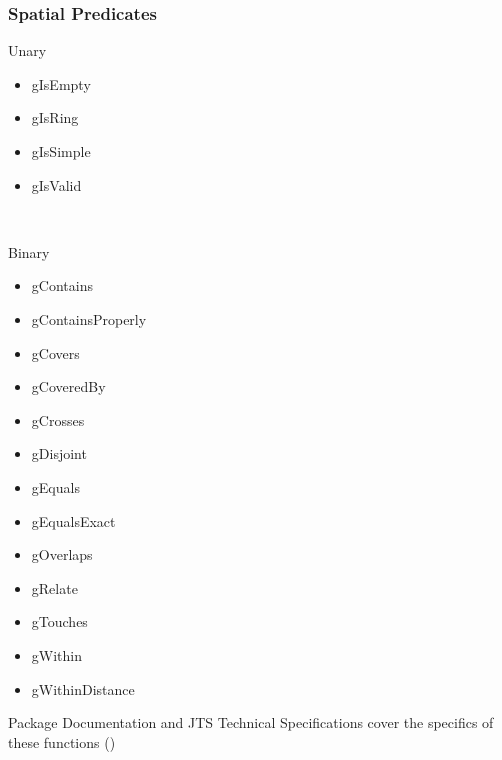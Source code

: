 \documentclass[slidestop,mathserif]{beamer}
\begin{document}
\begin{frame}
\frametitle{Spatial Predicates}

\begin{beamerboxesrounded}{Unary}
\begin{multicols}{3}
\begin{itemize}
    \item gIsEmpty
    \item gIsRing
    \item gIsSimple
    \item gIsValid
\end{itemize}
\end{multicols}
\end{beamerboxesrounded}
~\\
\begin{beamerboxesrounded}{Binary}
\begin{multicols}{3}
\begin{itemize}
    \item gContains
    \item gContainsProperly
    \item gCovers
    \item gCoveredBy
    \item gCrosses
    \item gDisjoint
    \item gEquals
    \item gEqualsExact
    \item gOverlaps
    \item gRelate
    \item gTouches
    \item gWithin
    \item gWithinDistance
\end{itemize}
\end{multicols}
\end{beamerboxesrounded}

\vfill

{\scriptsize Package Documentation and JTS Technical Specifications cover the specifics of these functions ()}

\end{frame}
\end{document}
